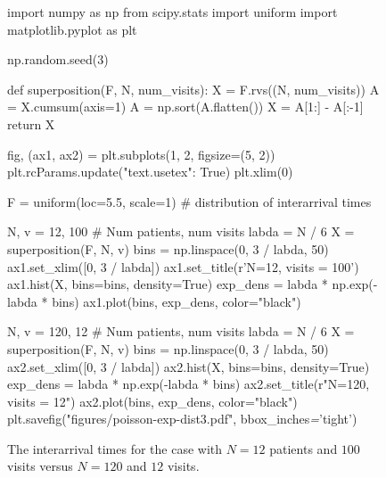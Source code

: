 \documentclass[a4paper,11pt]{article}
\newcommand{\1}[1]{\,I_{#1}} %
\begin{document}
\begin{figure}
\centering
\begin{pycode}
import numpy as np
from scipy.stats import uniform
import matplotlib.pyplot as plt

np.random.seed(3)


def superposition(F, N, num_visits):
    X = F.rvs((N, num_visits))
    A = X.cumsum(axis=1)
    A = np.sort(A.flatten())
    X = A[1:] - A[:-1]
    return X


fig, (ax1, ax2) = plt.subplots(1, 2, figsize=(5, 2))
plt.rcParams.update({"text.usetex": True})
plt.xlim(0)

F = uniform(loc=5.5, scale=1)  # distribution of interarrival times

N, v = 12, 100  # Num patients, num visits
labda = N / 6
X = superposition(F, N, v)
bins = np.linspace(0, 3 / labda, 50)
ax1.set_xlim([0, 3 / labda])
ax1.set_title(r'N=12, visits = 100')
ax1.hist(X, bins=bins, density=True)
exp_dens = labda * np.exp(-labda * bins)
ax1.plot(bins, exp_dens, color="black")

N, v = 120, 12  # Num patients, num visits
labda = N / 6
X = superposition(F, N, v)
bins = np.linspace(0, 3 / labda, 50)
ax2.set_xlim([0, 3 / labda])
ax2.hist(X, bins=bins, density=True)
exp_dens = labda * np.exp(-labda * bins)
ax2.set_title(r"N=120, visits = 12")
ax2.plot(bins, exp_dens, color="black")
plt.savefig("figures/poisson-exp-dist3.pdf", bbox_inches\textit='tight')
\end{pycode}
\caption{The interarrival times for the case with $N=12$ patients and $100$ visits versus $N=120$ and $12$ visits.}
\label{fig:expdist3}
\end{figure}
\end{document}
